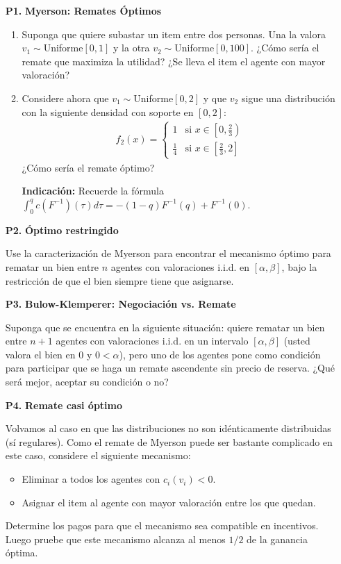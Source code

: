 \documentclass[11pt, spanish]{article}
\theoremstyle{plain}
\begin{document}
\begin{itemize}
\item[\textbf{P1.}] \textbf{Myerson: Remates Óptimos}
\begin{enumerate}
    \item Suponga que quiere subastar un item entre dos personas. Una la valora $v_1\sim$Uniforme$[0,1]$ y la otra
    $v_2\sim$Uniforme$[0,100]$. ¿Cómo sería el remate que maximiza
    la utilidad? ¿Se lleva el item el agente con mayor valoración?
  \item Considere ahora que $v_1\sim$Uniforme$[0,2]$ y que $v_2$ sigue una distribución con la
    siguiente densidad con soporte en $[0,2]$:
    \begin{align}
      f_2(x)= \begin{cases}
	1 & \text{si } x\in \left[0, \frac{2}{3}\right) \\
	  \frac{1}{4} & \text{si } x\in \left[ \frac{2}{3}, 2 \right]
	\end{cases}
    \end{align}
    ¿Cómo sería el remate óptimo?

    \textbf{Indicación:} Recuerde la fórmula $\int_0^q c(F^{-1})(\tau) d\tau = -(1-q)F^{-1}(q) + F^{-1}(0)$.
\end{enumerate}



\item[\textbf{P2.}] \textbf{Óptimo restringido}

  Use la caracterización de Myerson para encontrar
  el mecanismo óptimo para rematar
un bien entre $n$ agentes con valoraciones i.i.d. en $[\alpha,\beta]$, bajo la restricción de que el bien siempre
tiene que asignarse.

\item[\textbf{P3.}] \textbf{Bulow-Klemperer: Negociación vs. Remate}

Suponga que se encuentra en la siguiente situación: quiere
rematar un bien entre $n+1$ agentes con valoraciones i.i.d.
en un intervalo $[\alpha,\beta]$ (usted valora el bien en 0 y
$0<\alpha$), pero uno de los agentes pone como condición para
participar que se haga un remate ascendente sin precio de reserva.
¿Qué será mejor,
aceptar su condición o no?

\item[\textbf{P4.}] \textbf{Remate casi óptimo}

Volvamos al caso en que las distribuciones no son
idénticamente distribuidas (sí regulares). Como el remate
de Myerson puede ser bastante complicado en este caso, considere
el siguiente mecanismo:
\begin{itemize}
    \item Eliminar a todos los agentes con $c_i(v_i)<0$.
    \item Asignar el item al agente con mayor valoración entre los que quedan.
\end{itemize}
Determine los pagos para que el mecanismo sea compatible en incentivos.
Luego pruebe que este mecanismo alcanza al menos $1/2$ de la
ganancia óptima.


	

\end{itemize}
\end{document}
